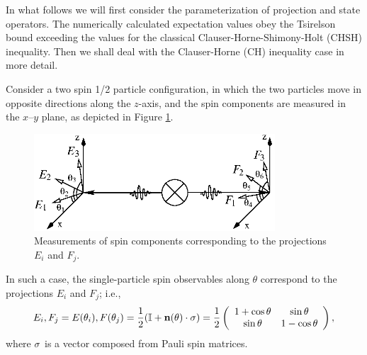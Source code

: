 In what follows we will first consider
the parameterization of projection and state operators.
The numerically calculated expectation values obey
the Tsirelson bound exceeding the
values for the classical Clauser-Horne-Shimony-Holt (CHSH) inequality.
Then we shall deal with the Clauser-Horne (CH)
inequality case in more detail.


Consider a two spin 1/2 particle configuration,
in which the two particles move in opposite directions along the $z$-axis,
and the spin components are measured in the $x$--$y$ plane,
as depicted in Figure \ref{f-2003-qpoly-1}.
\begin{figure}%
  \centering
\includegraphics[width=90mm]{2003-qpoly-eifj}
  \caption{Measurements of spin components corresponding to the projections  ${E}_i$ and ${F}_j$.}
  \label{f-2003-qpoly-1}
\end{figure}
In such a case, the single-particle
 spin observables along $\theta$ correspond to the projections
$E_{i}$ and $F_{j}$; i.e.,
\begin{equation}
  \label{e-2003-qpoly-1}
E_i,F_j=E(\theta_i),F(\theta_j)=\frac{1}{2}({\Bbb I} +{\bf n}(\theta)\cdot{\bf \sigma})=
\frac{1}{2}\left(
  \begin{array}{cc}
    1 + \cos\theta& \sin\theta\\
    \sin\theta&1 - \cos\theta
    \end{array}
\right),
\end{equation}
where ${\bf \sigma}$ is a vector composed from Pauli spin matrices.

